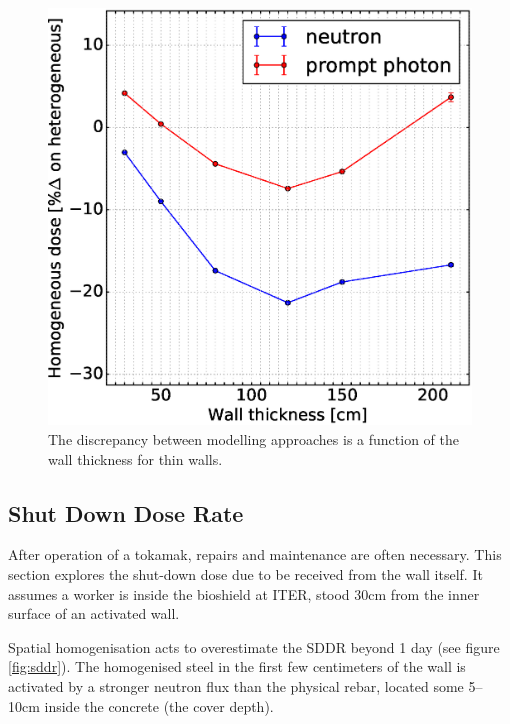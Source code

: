 \begin{figure}[H]
  \includegraphics[width=\textwidth]{wall_thickness_dose_discrep}
  \caption{The discrepancy between modelling approaches is a function of the wall thickness for thin walls.}
  \label{fig:dose_discrepancy}
\end{figure}

\subsection{Shut Down Dose Rate}
\label{subsec:sddr}

After operation of a tokamak, repairs and maintenance are often necessary. This section explores the shut-down dose due to be received from the wall itself. It assumes a worker is inside the bioshield at ITER, stood 30cm from the inner surface of an activated wall.\par
Spatial homogenisation acts to overestimate the SDDR beyond 1 day (see figure \ref{fig:sddr}). The homogenised steel in the first few centimeters of the wall is activated by a stronger neutron flux than the physical rebar, located some 5--10cm inside the concrete (the cover depth).

